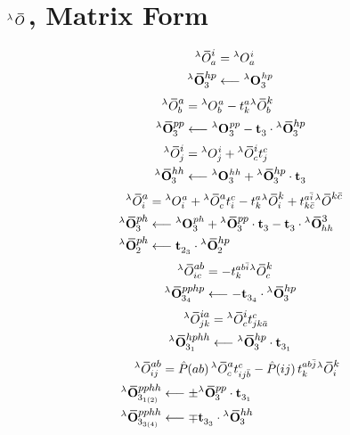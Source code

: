 \documentclass[thesis.tex]{subfiles}
\begin{document}
\section{${}^{\lambda}\EOp$, Matrix Form}

\begin{align}
  \oopint{\lambda}{i}{a} &= \opint{\lambda}{i}{a} \notag \\
  \boopint{\lambda}{hp}{3} &\longleftarrow \bopint{\lambda}{hp}{3}
\end{align}
\begin{align}
  \oopint{\lambda}{a}{b} &= \opint{\lambda}{a}{b} - \tamp{a}{k}\oopint{\lambda}{k}{b} \notag \\
  \boopint{\lambda}{pp}{3} &\longleftarrow \bopint{\lambda}{pp}{3} - \btamp{}{3}\cdot\boopint{\lambda}{hp}{3}
\end{align}
\begin{align}
  \oopint{\lambda}{i}{j} &= \opint{\lambda}{i}{j} + \oopint{\lambda}{i}{c}\tamp{c}{j} \notag \\
  \boopint{\lambda}{hh}{3} &\longleftarrow \bopint{\lambda}{hh}{3} + \boopint{\lambda}{hp}{3}\cdot\btamp{}{3}
\end{align}
\begin{align}
  \oopint{\lambda}{a}{i} &= \opint{\lambda}{a}{i} + \oopint{\lambda}{a}{c}\tamp{c}{i} - \tamp{a}{k}\oopint{\lambda}{k}{i} + \tamp{a\bar{i}}{k\bar{c}}\oopint{\lambda}{k\bar{c}}{} \notag \\
  \boopint{\lambda}{ph}{3} &\longleftarrow \bopint{\lambda}{ph}{3} + \boopint{\lambda}{pp}{3}\cdot\btamp{}{3} - \btamp{}{3}\cdot\boopint{\lambda}{3}{hh} \notag \\
  \boopint{\lambda}{ph}{2} &\longleftarrow \btamp{}{2_{3}}\cdot\boopint{\lambda}{hp}{2}
\end{align}
\begin{align}
  \oopint{\lambda}{ab}{ic} &= -\tamp{ab\bar{i}}{k}\oopint{\lambda}{k}{c} \notag \\
  \boopint{\lambda}{pphp}{3_{4}} &\longleftarrow -\btamp{}{3_{4}}\cdot\boopint{\lambda}{hp}{3}
\end{align}
\begin{align}
  \oopint{\lambda}{ia}{jk} &= \oopint{\lambda}{i}{c}\tamp{c}{jk\bar{a}} \notag \\
  \boopint{\lambda}{hphh}{3_{1}} &\longleftarrow \boopint{\lambda}{hp}{3}\cdot\btamp{}{3_{1}}
\end{align}
\begin{align}
  \oopint{\lambda}{ab}{ij} &= \Perm{ab}\oopint{\lambda}{a}{c}\tamp{c}{ij\bar{b}} - \Perm{ij}\tamp{ab\bar{j}}{k}\oopint{\lambda}{k}{i} \notag \\
  \boopint{\lambda}{pphh}{3_{1(2)}} &\longleftarrow \pm\boopint{\lambda}{pp}{3}\cdot\btamp{}{3_{1}} \notag \\
  \boopint{\lambda}{pphh}{3_{3(4)}} &\longleftarrow \mp\btamp{}{3_{3}}\cdot\boopint{\lambda}{hh}{3}
\end{align}
\end{document}
